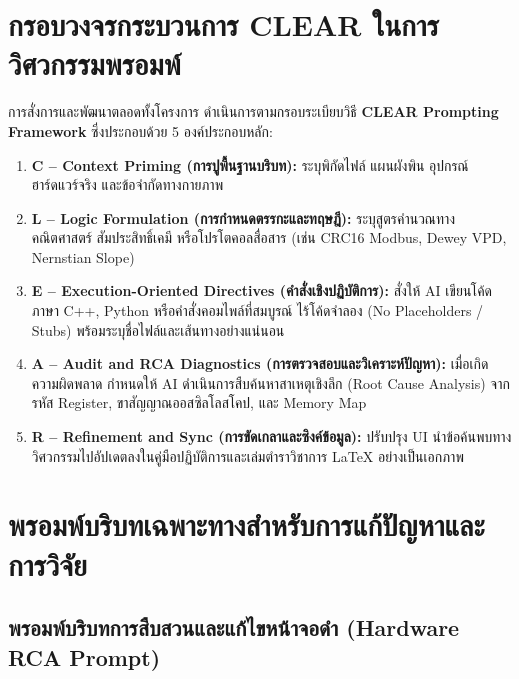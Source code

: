 \section{กรอบวงจรกระบวนการ CLEAR ในการวิศวกรรมพรอมพ์}

การสั่งการและพัฒนาตลอดทั้งโครงการ ดำเนินการตามกรอบระเบียบวิธี \textbf{CLEAR Prompting Framework} ซึ่งประกอบด้วย 5 องค์ประกอบหลัก:
\begin{enumerate}
    \item \textbf{C -- Context Priming (การปูพื้นฐานบริบท):} ระบุพิกัดไฟล์ แผนผังพิน อุปกรณ์ฮาร์ดแวร์จริง และข้อจำกัดทางกายภาพ
    \item \textbf{L -- Logic Formulation (การกำหนดตรรกะและทฤษฎี):} ระบุสูตรคำนวณทางคณิตศาสตร์ สัมประสิทธิ์เคมี หรือโปรโตคอลสื่อสาร (เช่น CRC16 Modbus, Dewey VPD, Nernstian Slope)
    \item \textbf{E -- Execution-Oriented Directives (คำสั่งเชิงปฏิบัติการ):} สั่งให้ AI เขียนโค้ดภาษา C++, Python หรือคำสั่งคอมไพล์ที่สมบูรณ์ ไร้โค้ดจำลอง (No Placeholders / Stubs) พร้อมระบุชื่อไฟล์และเส้นทางอย่างแน่นอน
    \item \textbf{A -- Audit and RCA Diagnostics (การตรวจสอบและวิเคราะห์ปัญหา):} เมื่อเกิดความผิดพลาด กำหนดให้ AI ดำเนินการสืบค้นหาสาเหตุเชิงลึก (Root Cause Analysis) จากรหัส Register, ขาสัญญาณออสซิลโลสโคป, และ Memory Map
    \item \textbf{R -- Refinement and Sync (การขัดเกลาและซิงค์ข้อมูล):} ปรับปรุง UI นำข้อค้นพบทางวิศวกรรมไปอัปเดตลงในคู่มือปฏิบัติการและเล่มตำราวิชาการ LaTeX อย่างเป็นเอกภาพ
\end{enumerate}

\section{พรอมพ์บริบทเฉพาะทางสำหรับการแก้ปัญหาและการวิจัย}

\subsection{พรอมพ์บริบทการสืบสวนและแก้ไขหน้าจอดำ (Hardware RCA Prompt)}


